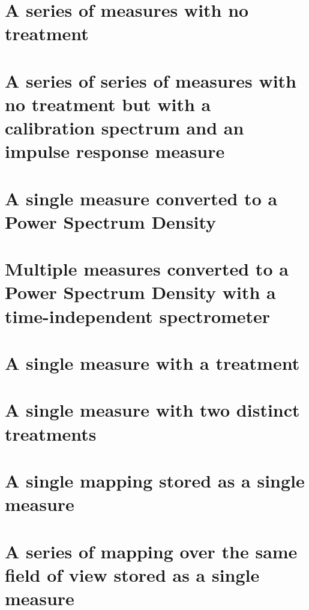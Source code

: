 \documentclass{book}
\begin{document}
    \section{A series of measures with no treatment}
        
    
    \section{A series of series of measures with no treatment but with a calibration spectrum and an impulse response measure}
        
    
    \section{A single measure converted to a Power Spectrum Density}
        
    
    \section{Multiple measures converted to a Power Spectrum Density with a time-independent spectrometer}
        

    \section{A single measure with a treatment}
        
    
    \section{A single measure with two distinct treatments}
        

    \section{A single mapping stored as a single measure}
        
    
    \section{A series of mapping over the same field of view stored as a single measure}
        
    
\end{document}
